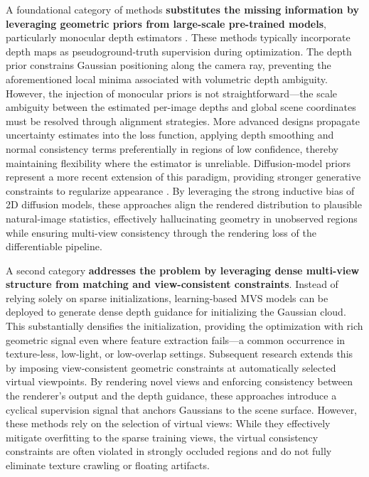 \documentclass[11pt,a4paper]{article}
\begin{document}
A foundational category of methods \textbf{substitutes the missing information by leveraging geometric priors from large-scale pre-trained models}, particularly monocular depth estimators \cite{arxiv:2403.13806v1,arxiv:2402.00525v1}. These methods typically incorporate depth maps as pseudoground-truth supervision during optimization. The depth prior constrains Gaussian positioning along the camera ray, preventing the aforementioned local minima associated with volumetric depth ambiguity. However, the injection of monocular priors is not straightforward---the scale ambiguity between the estimated per-image depths and global scene coordinates must be resolved through alignment strategies. More advanced designs propagate uncertainty estimates into the loss function, applying depth smoothing and normal consistency terms preferentially in regions of low confidence, thereby maintaining flexibility where the estimator is unreliable. Diffusion-model priors represent a more recent extension of this paradigm, providing stronger generative constraints to regularize appearance \cite{arxiv:2403.13806v1}. By leveraging the strong inductive bias of 2D diffusion models, these approaches align the rendered distribution to plausible natural-image statistics, effectively hallucinating geometry in unobserved regions while ensuring multi-view consistency through the rendering loss of the differentiable pipeline.

A second category \textbf{addresses the problem by leveraging dense multi-view structure from matching and view-consistent constraints}. Instead of relying solely on sparse initializations, learning-based MVS models can be deployed to generate dense depth guidance for initializing the Gaussian cloud. This substantially densifies the initialization, providing the optimization with rich geometric signal even where feature extraction fails---a common occurrence in texture-less, low-light, or low-overlap settings. Subsequent research extends this by imposing view-consistent geometric constraints at automatically selected virtual viewpoints. By rendering novel views and enforcing consistency between the renderer's output and the depth guidance, these approaches introduce a cyclical supervision signal that anchors Gaussians to the scene surface. However, these methods rely on the selection of virtual views: While they effectively mitigate overfitting to the sparse training views, the virtual consistency constraints are often violated in strongly occluded regions and do not fully eliminate texture crawling or floating artifacts.
\end{document}
